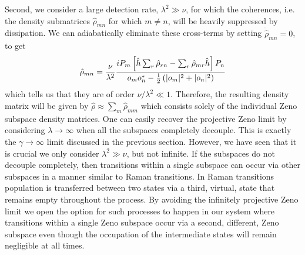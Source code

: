 Second, we consider a large detection rate, $\lambda^2 \gg \nu$, for
which the coherences, i.e.~ the density submatrices $\hat{\rho}_{mn}$
for which $m \ne n$, will be heavily suppressed by dissipation. We can
adiabatically eliminate these cross-terms by setting
$\dot{\hat{\rho}}_{mn} = 0$, to get
\begin{equation}
\label{eq:intermediate}
\hat{\rho}_{mn} = \frac{\nu}{\lambda^2} \frac{i P_m \left[ \hat{h} \sum_r \hat{\rho}_{rn} - \sum_r \hat{\rho}_{mr} \hat{h} \right] P_n } {o_m o_n^* - \frac{1}{2} \left( |o_m|^2 + |o_n|^2 \right)}
\end{equation}
which tells us that they are of order $\nu/\lambda^2 \ll
1$. Therefore, the resulting density matrix will be given by
$\hat{\rho} \approx \sum_m \hat{\rho}_{mm}$ which consists solely of
the individual Zeno subspace density matrices. One can easily recover
the projective Zeno limit by considering $\lambda \rightarrow \infty$
when all the subspaces completely decouple. This is exactly the
$\gamma \rightarrow \infty$ limit discussed in the previous
section. However, we have seen that it is crucial we only consider
$\lambda^2 \gg \nu$, but not infinite. If the subspaces do not
decouple completely, then transitions within a single subspace can
occur via other subspaces in a manner similar to Raman transitions. In
Raman transitions population is transferred between two states via a
third, virtual, state that remains empty throughout the process. By
avoiding the infinitely projective Zeno limit we open the option for
such processes to happen in our system where transitions within a
single Zeno subspace occur via a second, different, Zeno subspace even
though the occupation of the intermediate states will remain
negligible at all times.

